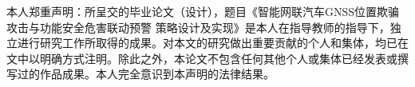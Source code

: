 \newpage

\centerline{\heiti{}}


\vskip 3cm 


\begin{spacing}{2.0}
本人郑重声明：所呈交的毕业论文（设计），题目《智能网联汽车GNSS位置欺骗攻击与功能安全危害联动预警
策略设计及实现》是本人在指导教师的指导下，独立进行研究工作所取得的成果。对本文的研究做出重要贡献的个人和集体，均已在文中以明确方式注明。除此之外，本论文不包含任何其他个人或集体已经发表或撰写过的作品成果。本人完全意识到本声明的法律结果。

\vskip 3cm

{}
\end{spacing}


